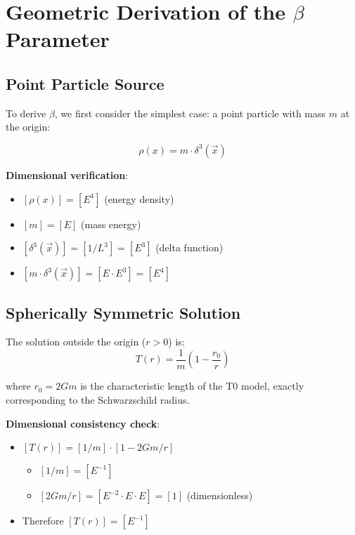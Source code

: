 \documentclass[12pt,a4paper]{article}
\newcommand{\vecx}{\vec{x}}
\begin{document}
	\section{Geometric Derivation of the $\beta$ Parameter}
	\label{sec:beta_derivation}
	
	\subsection{Point Particle Source}
	\label{subsec:point_source_beta}
	
	To derive $\beta$, we first consider the simplest case: a point particle with mass $m$ at the origin:
	
	\begin{equation}
		\label{eq:point_source_beta}
		\rho(x) = m \cdot \delta^3(\vecx)
	\end{equation}
	
	\textbf{Dimensional verification}:
	\begin{itemize}
		\item $[\rho(x)] = [E^4]$ (energy density)
		\item $[m] = [E]$ (mass energy)
		\item $[\delta^3(\vecx)] = [1/L^3] = [E^3]$ (delta function)
		\item $[m \cdot \delta^3(\vecx)] = [E \cdot E^3] = [E^4]$ \checkmark
	\end{itemize}
	
	\subsection{Spherically Symmetric Solution}
	\label{subsec:spherical_symmetry_beta}
	
	The solution outside the origin ($r > 0$) is:
	\begin{equation}
		T(r) = \frac{1}{m}\left(1 - \frac{r_0}{r}\right)
	\end{equation}
	
	where $r_0 = 2Gm$ is the characteristic length of the T0 model, exactly corresponding to the Schwarzschild radius.
	
	\textbf{Dimensional consistency check}:
	\begin{itemize}
		\item $[T(r)] = [1/m] \cdot [1 - 2Gm/r]$
		\begin{itemize}
			\item $[1/m] = [E^{-1}]$
			\item $[2Gm/r] = [E^{-2} \cdot E \cdot E] = [1]$ (dimensionless)
		\end{itemize}
		\item Therefore $[T(r)] = [E^{-1}]$ \checkmark
	\end{itemize}
	
\end{document}
